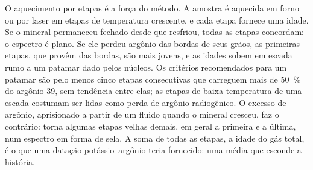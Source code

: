 O aquecimento por etapas é a força do método. A amostra é aquecida em forno
ou por laser em etapas de temperatura crescente, e cada etapa fornece uma idade.
Se o mineral permaneceu fechado desde que resfriou, todas as etapas concordam: o
espectro é plano. Se ele perdeu argônio das bordas de seus grãos, as primeiras etapas,
que provêm das bordas, são mais jovens, e as idades sobem em escada rumo a um
patamar dado pelos núcleos. Os critérios recomendados para um patamar são pelo
menos cinco etapas consecutivas que carreguem mais de \qty{50}{\percent} do
argônio-39, sem tendência entre elas; as etapas de baixa temperatura de uma escada
costumam ser lidas como perda de argônio radiogênico. O excesso de argônio, aprisionado
a partir de um fluido quando o mineral cresceu, faz o contrário: torna algumas etapas
velhas demais, em geral a primeira e a última, num espectro em forma de sela. A soma de
todas as etapas, a idade do gás total, é o que uma datação potássio--argônio teria
fornecido: uma média que esconde a história.

